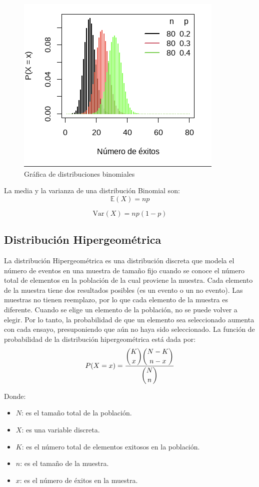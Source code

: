 \documentclass{article}
\begin{document}
\begin{figure}[H]
    \centering
    \includegraphics[width=0.5\linewidth]{Imagenes/Funcion de prob binomial.png}
    \caption{Gráfica de distribuciones binomiales}
    \label{fig:Func.prob binomial}
\end{figure}

 La media y la varianza de una distribución Binomial son:
\begin{equation}
    \mathbb{E}(X) = n p
\end{equation}

\begin{equation}
    \mathrm{Var}(X) = n p (1 - p)
\end{equation}

\subsection{Distribución Hipergeométrica}
La distribución Hipergeométrica es una distribución discreta que modela el número de eventos en una muestra de tamaño fijo cuando se conoce el número total de elementos en la población de la cual proviene la muestra. Cada elemento de la muestra tiene dos resultados posibles (es un evento o un no evento). Las muestras no tienen reemplazo, por lo que cada elemento de la muestra es diferente. Cuando se elige un elemento de la población, no se puede volver a elegir. Por lo tanto, la probabilidad de que un elemento sea seleccionado aumenta con cada ensayo, presuponiendo que aún no haya sido seleccionado. La función de probabilidad de la distribución hipergeométrica está dada por:
\begin{equation}
    P(X = x) = \frac{\dbinom{K}{x} \dbinom{N - K}{n - x}}{\dbinom{N}{n}}
\end{equation}

Donde:
\begin{itemize}
    \item \( N \): es el tamaño total de la población.
    \item \( X \): es una variable discreta.
    \item \( K \): es el número total de elementos exitosos en la población.
    \item \( n \): es el tamaño de la muestra.
    \item \( x \): es el número de éxitos en la muestra.
\end{itemize}
\end{document}
